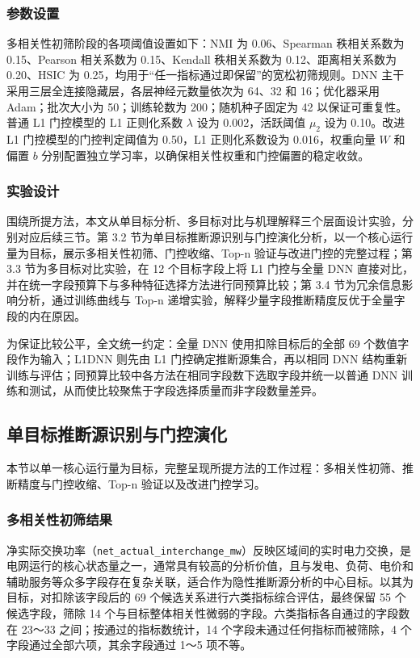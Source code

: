 \documentclass[UTF8,zihao=5,twoside]{ctexart}
\numberwithin{equation}{section}
\newcommand{\code}[1]{\texttt{#1}}
\begin{document}
\subsubsection{参数设置}
多相关性初筛阶段的各项阈值设置如下：NMI 为 0.06、Spearman 秩相关系数为 0.15、Pearson 相关系数为 0.15、Kendall 秩相关系数为 0.12、距离相关系数为 0.20、HSIC 为 0.25，均用于“任一指标通过即保留”的宽松初筛规则。DNN 主干采用三层全连接隐藏层，各层神经元数量依次为 64、32 和 16；优化器采用 Adam\cite{ref-kingma-adam}；批次大小为 50；训练轮数为 200；随机种子固定为 42 以保证可重复性。普通 L1 门控模型的 L1 正则化系数 $\lambda$ 设为 0.002，活跃阈值 $\mu_2$ 设为 0.10。改进 L1 门控模型的门控判定阈值为 0.50，L1 正则化系数设为 0.016，权重向量 $W$ 和偏置 $b$ 分别配置独立学习率，以确保相关性权重和门控偏置的稳定收敛。

\subsubsection{实验设计}
围绕所提方法，本文从单目标分析、多目标对比与机理解释三个层面设计实验，分别对应后续三节。第 3.2 节为单目标推断源识别与门控演化分析，以一个核心运行量为目标，展示多相关性初筛、门控收缩、Top-n 验证与改进门控的完整过程；第 3.3 节为多目标对比实验，在 12 个目标字段上将 L1 门控与全量 DNN 直接对比，并在统一字段预算下与多种特征选择方法进行同预算比较；第 3.4 节为冗余信息影响分析，通过训练曲线与 Top-n 递增实验，解释少量字段推断精度反优于全量字段的内在原因。

为保证比较公平，全文统一约定：全量 DNN 使用扣除目标后的全部 69 个数值字段作为输入；L1DNN 则先由 L1 门控确定推断源集合，再以相同 DNN 结构重新训练与评估；同预算比较中各方法在相同字段数下选取字段并统一以普通 DNN 训练和测试，从而使比较聚焦于字段选择质量而非字段数量差异。

\subsection{单目标推断源识别与门控演化}
本节以单一核心运行量为目标，完整呈现所提方法的工作过程：多相关性初筛、推断精度与门控收缩、Top-n 验证以及改进门控学习。

\subsubsection{多相关性初筛结果}
净实际交换功率（\code{net\_actual\_interchange\_mw}）反映区域间的实时电力交换，是电网运行的核心状态量之一，通常具有较高的分析价值，且与发电、负荷、电价和辅助服务等众多字段存在复杂关联，适合作为隐性推断源分析的中心目标。以其为目标，对扣除该字段后的 69 个候选关系进行六类指标综合评估，最终保留 55 个候选字段，筛除 14 个与目标整体相关性微弱的字段。六类指标各自通过的字段数在 23～33 之间；按通过的指标数统计，14 个字段未通过任何指标而被筛除，4 个字段通过全部六项，其余字段通过 1～5 项不等。
\end{document}
